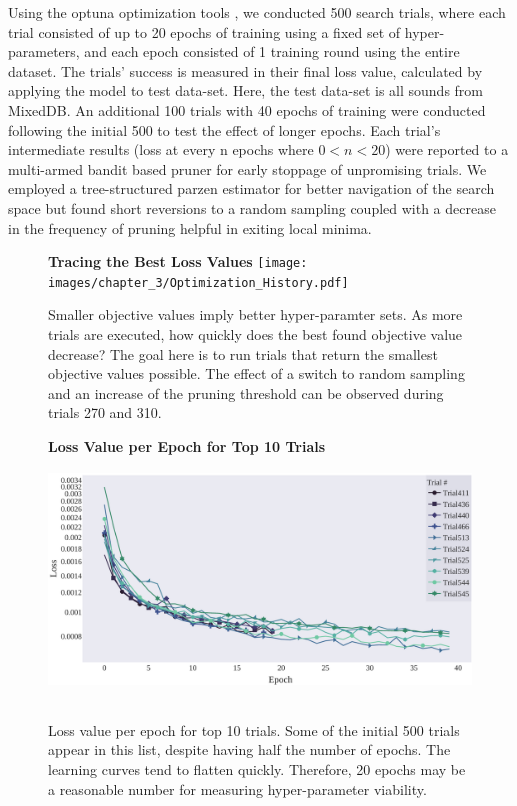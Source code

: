 \documentclass[\main/thesis.tex]{subfiles}
\begin{document}
Using the optuna optimization tools \cite{akiba2019optuna}, we conducted 500 search trials, where each trial consisted of up to 20 epochs of training using a fixed set of hyper-parameters, and each epoch consisted of 1 training round using the entire dataset. The trials' success is measured in their final loss value, calculated by applying the model to test data-set. Here, the test data-set is all sounds from MixedDB. An additional 100 trials with 40 epochs of training were conducted following the initial 500 to test the effect of longer epochs. Each trial's intermediate results (loss at every n epochs where $0<n<20$) were reported to a multi-armed bandit based pruner for early stoppage of unpromising trials\cite{li2017hyperband}. We employed a tree-structured parzen estimator for better navigation of the search space \cite{bergstra2011algorithms,akiba2019optuna} but found short reversions to a random sampling coupled with a decrease in the frequency of pruning helpful in exiting local minima. \\
\begin{figure}[htbp]
\centering
\textbf{Tracing the Best Loss Values}
\texttt{[image: images/chapter\_3/Optimization\_History.pdf]}
\caption{Smaller objective values imply better hyper-paramter sets. As more trials are executed, how quickly does the best found objective value decrease? The goal here is to run trials that return the smallest objective values possible.  The effect of a switch to random sampling and an increase of the pruning threshold can be observed during trials 270 and 310.}
\label{chap3:bestvalues}
\end{figure}

\begin{figure}[]
\centering
\textbf{Loss Value per Epoch for Top 10 Trials}
\includegraphics[width=12cm,height=6.5cm]{images/chapter_3/loss_per_training.pdf}
\caption{Loss value per epoch for top 10 trials. Some of the initial 500 trials appear in this list, despite having half the number of epochs. The learning curves tend to flatten quickly. Therefore, 20 epochs may be a reasonable number for measuring hyper-parameter viability. }
\label{chap3:top10}
\end{figure}
\end{document}
